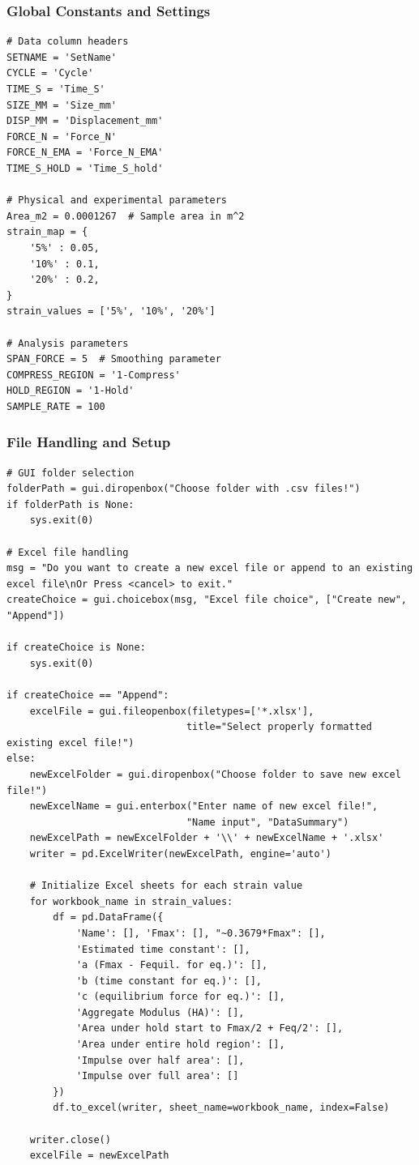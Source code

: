 \subsubsection{Global Constants and Settings}
\begin{lstlisting}[caption={Global constants and settings}]
# Data column headers
SETNAME = 'SetName'
CYCLE = 'Cycle'
TIME_S = 'Time_S'
SIZE_MM = 'Size_mm' 
DISP_MM = 'Displacement_mm'
FORCE_N = 'Force_N'
FORCE_N_EMA = 'Force_N_EMA'
TIME_S_HOLD = 'Time_S_hold'

# Physical and experimental parameters
Area_m2 = 0.0001267  # Sample area in m^2
strain_map = {
    '5%' : 0.05,
    '10%' : 0.1,
    '20%' : 0.2,
}
strain_values = ['5%', '10%', '20%']

# Analysis parameters
SPAN_FORCE = 5  # Smoothing parameter
COMPRESS_REGION = '1-Compress'
HOLD_REGION = '1-Hold'
SAMPLE_RATE = 100
\end{lstlisting}

\subsubsection{File Handling and Setup}
\begin{lstlisting}[caption={File handling and Excel setup}]
# GUI folder selection
folderPath = gui.diropenbox("Choose folder with .csv files!")
if folderPath is None:
    sys.exit(0)

# Excel file handling
msg = "Do you want to create a new excel file or append to an existing excel file\nOr Press <cancel> to exit."
createChoice = gui.choicebox(msg, "Excel file choice", ["Create new", "Append"])

if createChoice is None:
    sys.exit(0)

if createChoice == "Append":
    excelFile = gui.fileopenbox(filetypes=['*.xlsx'], 
                               title="Select properly formatted existing excel file!")
else:
    newExcelFolder = gui.diropenbox("Choose folder to save new excel file!")
    newExcelName = gui.enterbox("Enter name of new excel file!", 
                               "Name input", "DataSummary")
    newExcelPath = newExcelFolder + '\\' + newExcelName + '.xlsx'
    writer = pd.ExcelWriter(newExcelPath, engine='auto')

    # Initialize Excel sheets for each strain value
    for workbook_name in strain_values:
        df = pd.DataFrame({
            'Name': [], 'Fmax': [], "~0.3679*Fmax": [],
            'Estimated time constant': [], 
            'a (Fmax - Fequil. for eq.)': [],
            'b (time constant for eq.)': [],
            'c (equilibrium force for eq.)': [],
            'Aggregate Modulus (HA)': [],
            'Area under hold start to Fmax/2 + Feq/2': [],
            'Area under entire hold region': [],
            'Impulse over half area': [],
            'Impulse over full area': []
        })
        df.to_excel(writer, sheet_name=workbook_name, index=False)

    writer.close()
    excelFile = newExcelPath
\end{lstlisting}


